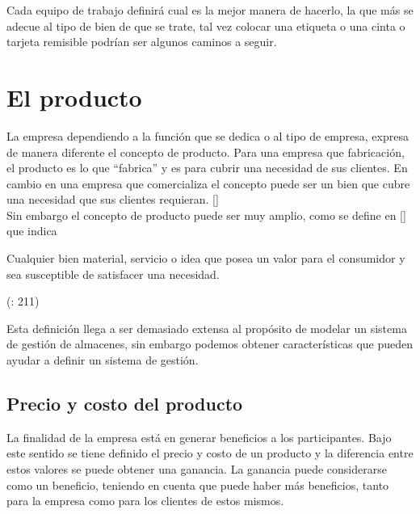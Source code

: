 Cada equipo de trabajo definirá cual es la mejor manera de hacerlo, la que más se adecue al tipo de bien de que se trate, tal vez colocar una etiqueta o una cinta o tarjeta remisible podrían ser algunos caminos a seguir.

\section{El producto}

La empresa dependiendo a la función que se dedica o al tipo de empresa, expresa de manera diferente el concepto de producto. Para una empresa que fabricación, el producto es lo que “fabrica” y es para cubrir una necesidad de sus clientes. En cambio en una empresa que comercializa el concepto puede ser un bien que cubre una necesidad que sus clientes requieran. [\citep{UDL:2019:Online}]\\

Sin embargo el concepto de producto puede ser muy amplio, como se define en [\citep{UDL:2019:Online}] que indica\\

\begin{center}
    \begin{minipage}{0.9\linewidth}
        \vspace{5pt}
        {\small
            Cualquier bien material, servicio o idea que posea un valor para el consumidor y sea susceptible de satisfacer una necesidad.
        }
        \begin{flushright}
            (\citeauthor{PrinStraMark}: 211)
        \end{flushright}
        \vspace{5pt}
    \end{minipage}
\end{center}

Esta definición llega a ser demasiado extensa al propósito de modelar un sistema de gestión de almacenes, sin embargo podemos obtener características que pueden ayudar a definir un sistema de gestión.

\subsection{Precio y costo del producto}

La finalidad de la empresa está en generar beneficios a los participantes. Bajo este sentido se tiene definido el precio y costo de un producto y la diferencia entre estos valores se puede obtener una ganancia. La ganancia puede considerarse como un beneficio, teniendo en cuenta que puede haber más beneficios, tanto para la empresa como para los clientes de estos mismos.\\

